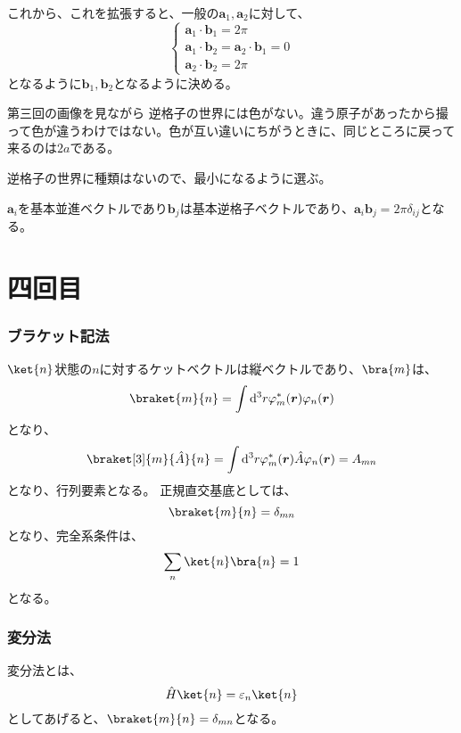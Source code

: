 \documentclass[titlepage]{ltjsarticle}
\newcommand{\mel}[3]{\braket[3]{#1}{#2}{#3}}
\begin{document}
これから、これを拡張すると、一般の\(\bm{a}_1,\bm{a}_2\)に対して、
\begin{equation}
  \begin{cases}
    \bm{a}_1 \cdot \bm{b}_1 = 2 \pi \\
    \bm{a}_1 \cdot \bm{b}_2 =\bm{a}_2 \cdot \bm{b}_1 =0 \\
    \bm{a}_2 \cdot \bm{b}_2 = 2 \pi
  \end{cases}
\end{equation}
となるように\(\bm{b}_1,\bm{b}_2\)となるように決める。

第三回の画像を見ながら
逆格子の世界には色がない。違う原子があったから撮って色が違うわけではない。色が互い違いにちがうときに、同じところに戻って来るのは\(2a\)である。

逆格子の世界に種類はないので、最小になるように選ぶ。

\(\bm{a}_i\)を基本並進ベクトルであり\(\bm{b}_j\)は基本逆格子ベクトルであり、\(\bm{a}_i \bm{b}_j=2\pi \delta_{ij}\)となる。

\section{四回目}

\subsubsection{ブラケット記法}
\(\ket{n}\)状態の\(n\)に対するケットベクトルは縦ベクトルであり、\(\bra{m}\)は、
\begin{equation}
  \braket{m}{n} = \int \odif[order=3]{r} \varphi_m^*(\bm{r})\varphi_n(\bm{r})
\end{equation}
となり、
\begin{equation}
  \mel{m}{\hat{A}}{n} = \int \odif[order=3]{r} \varphi_m^*(\bm{r})\hat{A}\varphi_n(\bm{r}) = A_{mn}
\end{equation}
となり、行列要素となる。
正規直交基底としては、
\begin{equation}
  \braket{m}{n} = \delta_{mn}
\end{equation}
となり、完全系条件は、
\begin{equation}
  \sum_{n} \ket{n}\bra{n} = 1
\end{equation}
となる。

\subsubsection{変分法}
変分法とは、
\begin{equation}
  \hat{H} \ket{n} = \varepsilon_n \ket{n}
\end{equation}
としてあげると、\(\braket{m}{n} = \delta_{mn}\)となる。
\end{document}
